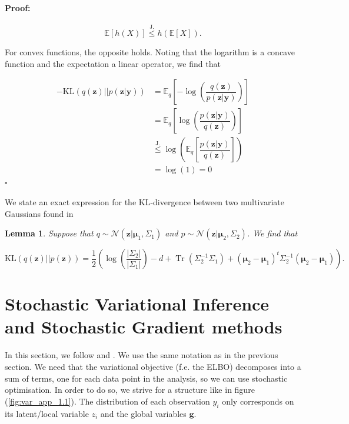 \documentclass[12pt,a4paper,oneside]{book}
\newtheorem{Lemma}{Lemma}
\newenvironment{proof}{\paragraph{Proof:}}{\hfill$\square$}
\DeclareMathOperator{\Tr}{Tr}
\begin{document}
{\begin{proof}
\begin{equation}
 \mathbb{E} [h(X)] \overset{\mathrm{J.}}{\leq} h(\mathbb{E}[X]).
\end{equation}

For convex functions, the opposite holds. Noting that the logarithm is a concave function and the expectation a linear operator, we find that

\begin{align}
-\text{KL}(q(\bm{z})||p(\bm{z}|\bm{y})) &= \mathbb{E}_q \left[ -\log \left( \dfrac{q(\bm{z})}{p(\bm{z}|\bm{y})} \right) \right]
\nonumber \\ &= \mathbb{E}_q \left[ \log \left( \dfrac{p(\bm{z}|\bm{y})}{q(\bm{z})} \right) \right]
\nonumber \\ &\overset{\mathrm{J.}}{\leq}  \log \left( \mathbb{E}_q \left[  \dfrac{p(\bm{z}|\bm{y})}{q(\bm{z})} \right] \right) \nonumber \\
&= \log(1) = 0  
\end{align} 
\end{proof}

We state an exact expression for the KL-divergence between two multivariate Gaussians found in \cite{duchi2007derivations}

\begin{Lemma}\label{KL_gaussian}
Suppose that $q \sim \mathcal{N}(\bm{z}|\bm{\mu}_1, \Sigma_1)$ and $p \sim \mathcal{N}(\bm{z}|\bm{\mu}_2, \Sigma_2)$. We find that 

\begin{equation}
\text{KL} (q(\bm{z})||p(\bm{z})) = \dfrac{1}{2} \left( \log \left( \dfrac{|\Sigma_2|}{|\Sigma_1|} \right) - d + \Tr ( \Sigma_2^{-1} \Sigma_1) + (\bm{\mu}_2 - \bm{\mu}_1)^t \Sigma_2^{-1} (\bm{\mu}_2 - \bm{\mu}_1) \right).
\end{equation}
\end{Lemma}


\section{Stochastic Variational Inference and Stochastic Gradient methods} \label{appendix_var_inf}

 
In this section, we follow \cite{bottou2010large} and \cite{blei2017variational}. We use the same notation as in the previous section. We need that the variational objective (f.e. the ELBO) decomposes into a sum of terms, one for each data point in the analysis, so we can use stochastic optimisation. In order to do so, we strive for a structure like in figure (\ref{fig:var_app_1.1}). The distribution of each observation $y_i$ only corresponds on its latent/local variable $z_i$ and the global variables $\bm{g}$. 

}
\end{document}
